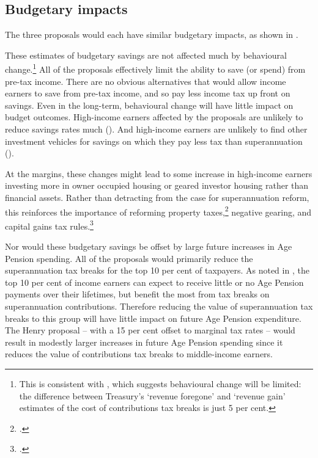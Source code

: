 \subsection{Budgetary impacts}
The three proposals would each have similar budgetary impacts, as shown in .  

These estimates of budgetary savings are not affected much by behavioural change.\footnote{This is consistent with \textcite{Treasury2015TES2014}, which suggests behavioural change will be limited: the difference between Treasury’s ‘revenue foregone’ and ‘revenue gain’ estimates of the cost of contributions tax breaks is just 5 per cent.}  All of the proposals effectively limit the ability to save (or spend) from pre-tax income. There are no obvious alternatives that would allow income earners to save from pre-tax income, and so pay less income tax up front on savings. Even in the long-term, behavioural change will have little impact on budget outcomes. High-income earners affected by the proposals are unlikely to reduce savings rates much (). And high-income earners are unlikely to find other investment vehicles for savings on which they pay less tax than superannuation (). 

At the margins, these changes might lead to some increase in high-income earners investing more in owner occupied housing or geared investor housing rather than financial assets. Rather than detracting from the case for superannuation reform, this reinforces the importance of reforming property taxes,\footcite{DaleyCoates2015PropertyTaxes}  negative gearing, and capital gains tax rules.\footnote{\textcites{DaleyMcGannonSavage2013BudgetPressures}{DaleyWood2016NG}.}

Nor would these budgetary savings be offset by large future increases in Age Pension spending. All of the proposals would primarily reduce the superannuation tax breaks for the top 10 per cent of taxpayers. As noted in , the top 10 per cent of income earners can expect to receive little or no Age Pension payments over their lifetimes, but benefit the most from tax breaks on superannuation contributions. Therefore reducing the value of superannuation tax breaks to this group will have little impact on future Age Pension expenditure. The Henry proposal – with a 15 per cent offset to marginal tax rates – would result in modestly larger increases in future Age Pension spending since it reduces the value of contributions tax breaks to middle-income earners.

